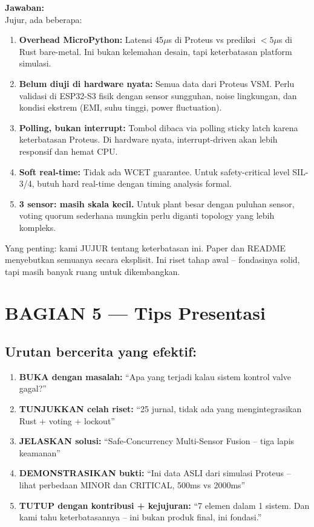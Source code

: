 \documentclass[12pt,a4paper]{article}
\begin{document}
\textbf{Jawaban:}\\
Jujur, ada beberapa:

\begin{enumerate}[nosep]
    \item \textbf{Overhead MicroPython:} Latensi 45$\mu$s di Proteus vs prediksi $<5\mu$s di Rust
          bare-metal. Ini bukan kelemahan desain, tapi keterbatasan platform simulasi.

    \item \textbf{Belum diuji di hardware nyata:} Semua data dari Proteus VSM. Perlu
          validasi di ESP32-S3 fisik dengan sensor sungguhan, noise lingkungan, dan
          kondisi ekstrem (EMI, suhu tinggi, power fluctuation).

    \item \textbf{Polling, bukan interrupt:} Tombol dibaca via polling sticky latch karena
          keterbatasan Proteus. Di hardware nyata, interrupt-driven akan lebih responsif
          dan hemat CPU.

    \item \textbf{Soft real-time:} Tidak ada WCET guarantee. Untuk safety-critical level
          SIL-3/4, butuh hard real-time dengan timing analysis formal.

    \item \textbf{3 sensor: masih skala kecil.} Untuk plant besar dengan puluhan sensor,
          voting quorum sederhana mungkin perlu diganti topology yang lebih kompleks.
\end{enumerate}

Yang penting: kami JUJUR tentang keterbatasan ini. Paper dan README menyebutkan
semuanya secara eksplisit. Ini riset tahap awal -- fondasinya solid, tapi
masih banyak ruang untuk dikembangkan.

\section{BAGIAN 5 --- Tips Presentasi}

\subsection{Urutan bercerita yang efektif:}

\begin{enumerate}[nosep]
    \item \textbf{BUKA dengan masalah:} ``Apa yang terjadi kalau sistem kontrol valve gagal?''
    \item \textbf{TUNJUKKAN celah riset:} ``25 jurnal, tidak ada yang mengintegrasikan
          Rust + voting + lockout''
    \item \textbf{JELASKAN solusi:} ``Safe-Concurrency Multi-Sensor Fusion -- tiga lapis
          keamanan''
    \item \textbf{DEMONSTRASIKAN bukti:} ``Ini data ASLI dari simulasi Proteus -- lihat
          perbedaan MINOR dan CRITICAL, 500ms vs 2000ms''
    \item \textbf{TUTUP dengan kontribusi + kejujuran:} ``7 elemen dalam 1 sistem. Dan kami
          tahu keterbatasannya -- ini bukan produk final, ini fondasi.''
\end{enumerate}
\end{document}
